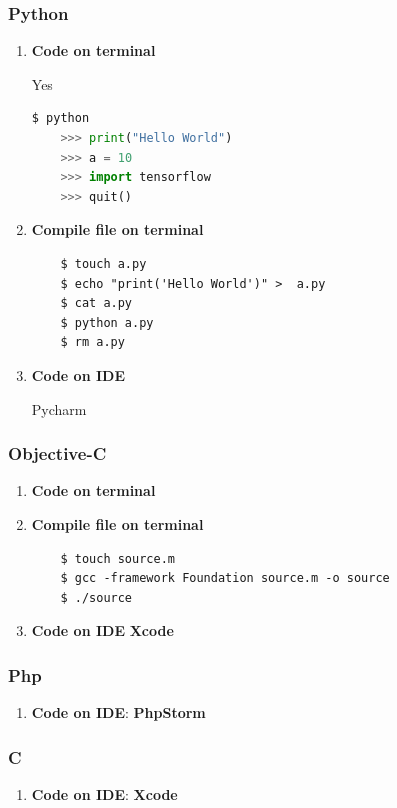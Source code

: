 \documentclass[12pt, a4paper]{report}
\begin{document}
		
		\subsubsection{Python}
	        \begin{enumerate}
	            \item \textbf{Code on terminal}  \par 
	            Yes
	            \begin{lstlisting}[language=python]
	$ python
	>>> print("Hello World")
	>>> a = 10
	>>> import tensorflow
	>>> quit()
    			\end{lstlisting}
    			\item \textbf{Compile file on terminal} 
    			\begin{lstlisting}
	$ touch a.py
	$ echo "print('Hello World')" >  a.py
    $ cat a.py 	
	$ python a.py
	$ rm a.py
    			\end{lstlisting}
    			\item \textbf{Code on IDE} \par 
    			Pycharm 
	        \end{enumerate}
			
		\subsubsection{Objective-C}
		    \begin{enumerate}
		        \item \textbf{Code on terminal} 
		        \item \textbf{Compile file on terminal}
		        \begin{lstlisting}
    $ touch source.m
	$ gcc -framework Foundation source.m -o source
	$ ./source
    			\end{lstlisting}
		        \item \textbf{Code on IDE} \textbf{Xcode}\par 
		    \end{enumerate}
			
		\subsubsection{Php}
		\begin{enumerate}
		    \item \textbf{Code on IDE}: \quad \textbf{PhpStorm}\par
        \end{enumerate}
		    
        \subsubsection{C}
        \begin{enumerate}
            \item \textbf{Code on IDE}: \quad  \textbf{Xcode}\par 
        \end{enumerate}
		    
\end{document}
